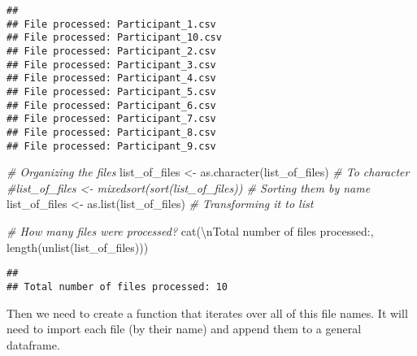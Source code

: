 \documentclass[
]{book}
\newenvironment{Shaded}{\begin{snugshade}}{\end{snugshade}}
\newcommand{\CommentTok}[1]{\textcolor[rgb]{0.56,0.35,0.01}{\textit{#1}}}
\newcommand{\FunctionTok}[1]{\textcolor[rgb]{0.00,0.00,0.00}{#1}}
\newcommand{\NormalTok}[1]{#1}
\newcommand{\OtherTok}[1]{\textcolor[rgb]{0.56,0.35,0.01}{#1}}
\newcommand{\SpecialCharTok}[1]{\textcolor[rgb]{0.00,0.00,0.00}{#1}}
\newcommand{\StringTok}[1]{\textcolor[rgb]{0.31,0.60,0.02}{#1}}
\begin{document}
\begin{verbatim}
## 
## File processed: Participant_1.csv
## File processed: Participant_10.csv
## File processed: Participant_2.csv
## File processed: Participant_3.csv
## File processed: Participant_4.csv
## File processed: Participant_5.csv
## File processed: Participant_6.csv
## File processed: Participant_7.csv
## File processed: Participant_8.csv
## File processed: Participant_9.csv
\end{verbatim}

\begin{Shaded}
\begin{Highlighting}[]
\CommentTok{\# Organizing the files}
\NormalTok{list\_of\_files }\OtherTok{\textless{}{-}} \FunctionTok{as.character}\NormalTok{(list\_of\_files)  }\CommentTok{\# To character}
\CommentTok{\#list\_of\_files \textless{}{-} mixedsort(sort(list\_of\_files))  \# Sorting them by name}
\NormalTok{list\_of\_files }\OtherTok{\textless{}{-}} \FunctionTok{as.list}\NormalTok{(list\_of\_files)  }\CommentTok{\# Transforming it to list}

\CommentTok{\# How many files were processed?}
\FunctionTok{cat}\NormalTok{(}\StringTok{\textquotesingle{}}\SpecialCharTok{\textbackslash{}n}\StringTok{Total number of files processed:\textquotesingle{}}\NormalTok{, }\FunctionTok{length}\NormalTok{(}\FunctionTok{unlist}\NormalTok{(list\_of\_files)))}
\end{Highlighting}
\end{Shaded}

\begin{verbatim}
## 
## Total number of files processed: 10
\end{verbatim}

Then we need to create a function that iterates over all of this file names. It will need to import each file (by their name) and append them to a general dataframe.
\end{document}
